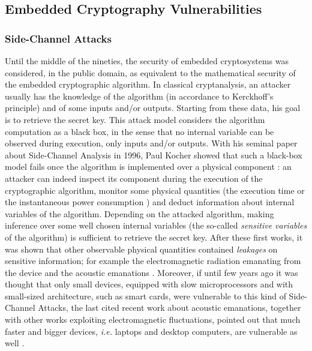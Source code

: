 \subsection{Embedded Cryptography Vulnerabilities}\label{sec:vulnerabilities}
\subsubsection{Side-Channel Attacks}\label{sec:SCAintro}
Until the middle of the nineties, the security of embedded cryptosystems was considered, in the public domain, as equivalent to the mathematical security of the embedded cryptographic algorithm. In classical cryptanalysis, an attacker usually has the knowledge of the algorithm (in accordance to Kerckhoff's principle) and of some inputs and/or outputs. Starting from these data, his goal is to retrieve the secret key. This attack model considers the algorithm computation as a black box, in the sense that no internal variable can be observed during execution, only inputs and/or outputs. With his seminal paper about Side-Channel Analysis in 1996, Paul Kocher showed that such a black-box model fails once the algorithm is implemented over a physical component \cite{kocher1996timing}: an attacker can indeed inspect its component during the execution of the cryptographic algorithm, monitor some physical quantities (\eg the execution time \cite{kocher1996timing} or the instantaneous power consumption \cite{kocher1999differential}) and deduct information about internal variables of the algorithm. Depending on the attacked algorithm, making inference over some well chosen internal variables (the so-called \emph{sensitive variables} of the algorithm) is sufficient to retrieve the secret key. After these first works, it was shown that other observable physical quantities contained \emph{leakages} on sensitive information; for example the electromagnetic radiation emanating from the device \cite{gandolfi2001electromagnetic,quisquater2001electromagnetic} and the acoustic emanations \cite{genkin2014rsa}. Moreover, if until few years ago it was thought that only small devices, equipped with slow microprocessors and with small-sized architecture, such as smart cards, were vulnerable to this kind of Side-Channel Attacks, the last cited recent work about acoustic emanations, together with other works exploiting electromagnetic fluctuations, pointed out that much faster and bigger devices, \emph{i.e.} laptops and desktop computers, are vulnerable as well \cite{genkin2015stealing,genkin2015get,genkin2016ecdh}.

